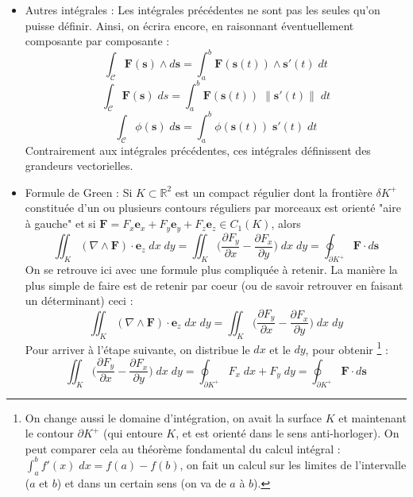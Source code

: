 \documentclass[a4paper]{article}
\begin{document}
\begin{itemize}
\item Autres intégrales : Les intégrales précédentes ne sont pas les seules qu'on puisse définir. Ainsi, on écrira encore, en raisonnant éventuellement composante par composante : 
\[ \int_\mathcal{C} \textbf{F}(\textbf{s}) \wedge d \textbf{s} = \int_a^b \textbf{F}(\textbf{s}(t)) \wedge \textbf{s}'(t) \; d t \]
\[ \int_\mathcal{C} \textbf{F}(\textbf{s}) \; d s = \int_a^b \textbf{F}(\textbf{s}(t)) \; \| \textbf{s}'(t) \| \; d t \]
\[ \int_\mathcal{C} \phi(\textbf{s}) \; d \textbf{s} = \int_a^b \phi(\textbf{s}(t)) \; \textbf{s}'(t) \; d t \]
Contrairement aux intégrales précédentes, ces intégrales définissent des grandeurs vectorielles.






\item Formule de Green : Si $ K \subset \mathbb{R}^2 $ est un compact régulier dont la frontière $ \delta K^+ $ constituée d'un ou plusieurs contours réguliers par morceaux est orienté "aire à gauche" et si $ \textbf{F} = F_x \textbf{e}_x + F_y \textbf{e}_y + F_z \textbf{e}_z \in C_1 (K) $, alors 
\[ \iint_K (\nabla \wedge \textbf{F}) \cdot \textbf{e}_z \; d x \; d y = \iint_K \bigg( \frac{\partial F_y}{\partial x} - \frac{\partial F_x}{\partial y} \bigg) \; d x \; d y = \oint_{\partial K^+} \textbf{F} \cdot d \textbf{s} \]
On se retrouve ici avec une formule plus compliquée à retenir. La manière la plus simple de faire est de retenir par coeur (ou de savoir retrouver en faisant un déterminant) ceci : 
\[ \iint_K (\nabla \wedge \textbf{F}) \cdot \textbf{e}_z \; d x \; d y = \iint_K \bigg( \frac{\partial F_y}{\partial x} - \frac{\partial F_x}{\partial y} \bigg) \; d x \; d y \]
Pour arriver à l'étape suivante, on distribue le $ d x $ et le $ d y $, pour obtenir \footnote{On change aussi le domaine d'intégration, on avait la surface $ K $ et maintenant le contour $ \partial K^+ $ (qui entoure $ K $, et est orienté dans le sens anti-horloger). On peut comparer cela au théorème fondamental du calcul intégral : $\displaystyle \int_a^b f'(x) \; d x = f(a) - f(b) $, on fait un calcul sur les limites de l'intervalle ($ a $ et $ b $) et dans un certain sens (on va de $ a $ à $ b $).} : 
\[ \iint_K \bigg( \frac{\partial F_y}{\partial x} - \frac{\partial F_x}{\partial y} \bigg) \; d x \; d y 
= \oint_{\partial K^+} F_x \; d x + F_y \; d y
= \oint_{\partial K^+} \textbf{F} \cdot d \textbf{s} \]







\end{itemize}
\end{document}
